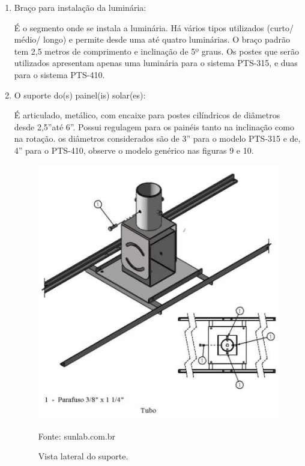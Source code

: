 \begin{enumerate}
	\item Braço para instalação da luminária:
	
	É o segmento onde se instala a luminária. Há vários tipos utilizados (curto/ médio/ longo) e permite desde uma até quatro luminárias. O braço padrão tem 2,5 metros de comprimento e inclinação de 5º graus. Os postes que serão utilizados apresentam  apenas uma luminária para o sistema PTS-315, e duas para o sistema PTS-410.
	
	\item O suporte do(s) painel(is) solar(es):
	
	\'E articulado, metálico, com encaixe para postes cilíndricos de diâmetros desde 2,5”até 6”. Possui regulagem para os painéis tanto na inclinação como na rotação. os diâmetros considerados são de 3” para o modelo PTS-315 e de, 4” para o PTS-410, observe o modelo genérico nas figuras 9 e 10.
	
\begin{figure}[H]
	 \centering
	\label{Vista lateral do suporte}
	 \includegraphics[keepaspectratio=true,scale=0.8]{postes/10.png}
	 \caption{Vista lateral do suporte.}
	 \small{Fonte: sunlab.com.br}
\end{figure}


\end{enumerate}
